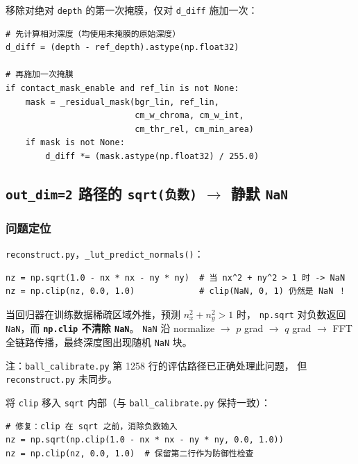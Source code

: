 \documentclass[12pt, a4paper]{ctexart}
\begin{document}
\begin{fixbox}
移除对绝对 \texttt{depth} 的第一次掩膜，仅对 \texttt{d\_diff} 施加一次：

\begin{lstlisting}
# 先计算相对深度（均使用未掩膜的原始深度）
d_diff = (depth - ref_depth).astype(np.float32)

# 再施加一次掩膜
if contact_mask_enable and ref_lin is not None:
    mask = _residual_mask(bgr_lin, ref_lin,
                          cm_w_chroma, cm_w_int,
                          cm_thr_rel, cm_min_area)
    if mask is not None:
        d_diff *= (mask.astype(np.float32) / 255.0)
\end{lstlisting}
\end{fixbox}

\subsection{\texttt{out\_dim=2} 路径的 \texttt{sqrt(负数)} $\to$ 静默 \texttt{NaN}}
\label{subsec:sqrt_nan}

\subsubsection*{问题定位}

\texttt{reconstruct.py}，\texttt{\_lut\_predict\_normals()}：

\begin{lstlisting}[caption={clip 在 sqrt 之后无法清除 NaN}]
nz = np.sqrt(1.0 - nx * nx - ny * ny)  # 当 nx^2 + ny^2 > 1 时 -> NaN
nz = np.clip(nz, 0.0, 1.0)             # clip(NaN, 0, 1) 仍然是 NaN ！
\end{lstlisting}

\begin{bugbox}
当回归器在训练数据稀疏区域外推，预测 $n_x^2 + n_y^2 > 1$ 时，
\texttt{np.sqrt} 对负数返回 \texttt{NaN}，而
\textbf{\texttt{np.clip} 不清除 \texttt{NaN}}。
\texttt{NaN} 沿 normalize $\to$ $p$ grad $\to$ $q$ grad $\to$ FFT
全链路传播，最终深度图出现随机 \texttt{NaN} 块。

注：\texttt{ball\_calibrate.py} 第 1258 行的评估路径已正确处理此问题，
但 \texttt{reconstruct.py} 未同步。
\end{bugbox}

\begin{fixbox}
将 \texttt{clip} 移入 \texttt{sqrt} 内部（与 \texttt{ball\_calibrate.py} 保持一致）：

\begin{lstlisting}
# 修复：clip 在 sqrt 之前，消除负数输入
nz = np.sqrt(np.clip(1.0 - nx * nx - ny * ny, 0.0, 1.0))
nz = np.clip(nz, 0.0, 1.0)  # 保留第二行作为防御性检查
\end{lstlisting}
\end{fixbox}
\end{document}
